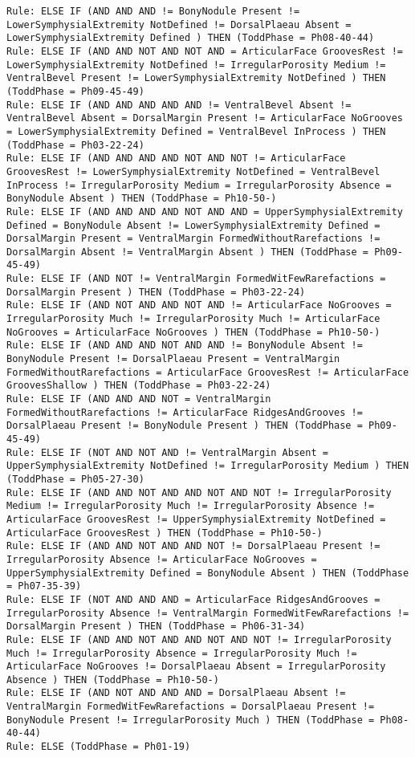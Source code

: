 \begin{lstlisting}
Rule: ELSE IF (AND AND AND != BonyNodule Present != LowerSymphysialExtremity NotDefined != DorsalPlaeau Absent = LowerSymphysialExtremity Defined ) THEN (ToddPhase = Ph08-40-44)
Rule: ELSE IF (AND AND NOT AND NOT AND = ArticularFace GroovesRest != LowerSymphysialExtremity NotDefined != IrregularPorosity Medium != VentralBevel Present != LowerSymphysialExtremity NotDefined ) THEN (ToddPhase = Ph09-45-49)
Rule: ELSE IF (AND AND AND AND AND != VentralBevel Absent != VentralBevel Absent = DorsalMargin Present != ArticularFace NoGrooves = LowerSymphysialExtremity Defined = VentralBevel InProcess ) THEN (ToddPhase = Ph03-22-24)
Rule: ELSE IF (AND AND AND AND NOT AND NOT != ArticularFace GroovesRest != LowerSymphysialExtremity NotDefined = VentralBevel InProcess != IrregularPorosity Medium = IrregularPorosity Absence = BonyNodule Absent ) THEN (ToddPhase = Ph10-50-)
Rule: ELSE IF (AND AND AND AND NOT AND AND = UpperSymphysialExtremity Defined = BonyNodule Absent != LowerSymphysialExtremity Defined = DorsalMargin Present = VentralMargin FormedWithoutRarefactions != DorsalMargin Absent != VentralMargin Absent ) THEN (ToddPhase = Ph09-45-49)
Rule: ELSE IF (AND NOT != VentralMargin FormedWitFewRarefactions = DorsalMargin Present ) THEN (ToddPhase = Ph03-22-24)
Rule: ELSE IF (AND NOT AND AND NOT AND != ArticularFace NoGrooves = IrregularPorosity Much != IrregularPorosity Much != ArticularFace NoGrooves = ArticularFace NoGrooves ) THEN (ToddPhase = Ph10-50-)
Rule: ELSE IF (AND AND AND NOT AND AND != BonyNodule Absent != BonyNodule Present != DorsalPlaeau Present = VentralMargin FormedWithoutRarefactions = ArticularFace GroovesRest != ArticularFace GroovesShallow ) THEN (ToddPhase = Ph03-22-24)
Rule: ELSE IF (AND AND AND NOT = VentralMargin FormedWithoutRarefactions != ArticularFace RidgesAndGrooves != DorsalPlaeau Present != BonyNodule Present ) THEN (ToddPhase = Ph09-45-49)
Rule: ELSE IF (NOT AND NOT AND != VentralMargin Absent = UpperSymphysialExtremity NotDefined != IrregularPorosity Medium ) THEN (ToddPhase = Ph05-27-30)
Rule: ELSE IF (AND AND NOT AND AND NOT AND NOT != IrregularPorosity Medium != IrregularPorosity Much != IrregularPorosity Absence != ArticularFace GroovesRest != UpperSymphysialExtremity NotDefined = ArticularFace GroovesRest ) THEN (ToddPhase = Ph10-50-)
Rule: ELSE IF (AND AND NOT AND AND NOT != DorsalPlaeau Present != IrregularPorosity Absence != ArticularFace NoGrooves = UpperSymphysialExtremity Defined = BonyNodule Absent ) THEN (ToddPhase = Ph07-35-39)
Rule: ELSE IF (NOT AND AND AND = ArticularFace RidgesAndGrooves = IrregularPorosity Absence != VentralMargin FormedWitFewRarefactions != DorsalMargin Present ) THEN (ToddPhase = Ph06-31-34)
Rule: ELSE IF (AND AND NOT AND AND NOT AND NOT != IrregularPorosity Much != IrregularPorosity Absence = IrregularPorosity Much != ArticularFace NoGrooves != DorsalPlaeau Absent = IrregularPorosity Absence ) THEN (ToddPhase = Ph10-50-)
Rule: ELSE IF (AND NOT AND AND AND = DorsalPlaeau Absent != VentralMargin FormedWitFewRarefactions = DorsalPlaeau Present != BonyNodule Present != IrregularPorosity Much ) THEN (ToddPhase = Ph08-40-44)
Rule: ELSE (ToddPhase = Ph01-19)
\end{lstlisting}


\newpage
